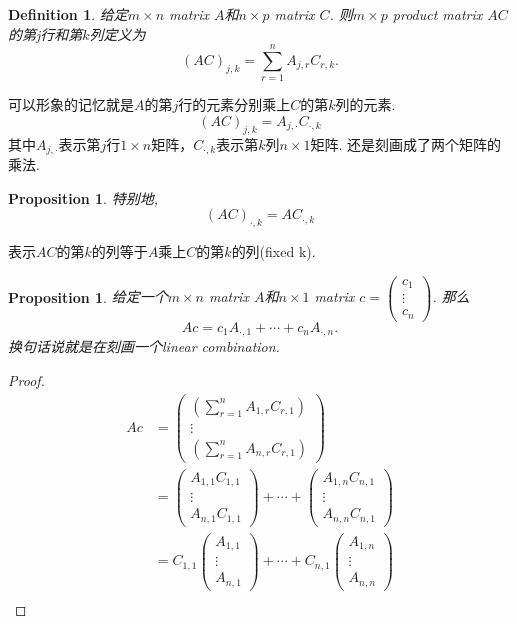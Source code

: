 \documentclass{article}
\newtheorem{proposition}[theorem]{Proposition}
\newtheorem{definition}[theorem]{Definition}
\begin{document}
\begin{definition}
\rm 给定$ m \times n$ matrix $A$和$n \times p$ matrix $C$. 则$m \times p$ product matrix $AC$的第j行和第$k$列定义为
$$
(AC)_{j,k} =  \sum\limits_{r=1}^{n}A_{j,r}C_{r,k} .
$$
\end{definition}

{\color{blue} 可以形象的记忆就是$A$的第$j$行的元素分别乘上$C$的第$k$列的元素}.
$$
(AC)_{j,k}=A_{j,\cdot}C_{\cdot,k}
$$
其中$A_{j,\cdot}$表示第$j$行$1 \times n$矩阵，$C_{\cdot,k}$表示第$k$列$n \times 1$矩阵. 还是刻画成了两个矩阵的乘法.

\begin{proposition}
特别地,
$$
(AC)_{\cdot,k}=AC_{\cdot,k}
$$
\end{proposition}
表示$AC$的第$k$的列等于$A$乘上$C$的第$k$的列(fixed k).

\begin{proposition}
\rm 给定一个$m \times n$ matrix $A$和$n \times 1$ matrix $c = \begin{pmatrix} c_1 \\ \vdots \\ c_n \end{pmatrix}$. 那么
$$
Ac = c_1A_{\cdot,1} + \cdots + c_nA_{\cdot,n}.
$$
换句话说就是在刻画一个linear combination.
\end{proposition}

\begin{proof}
$$
\begin{aligned}
Ac &=  
\begin{pmatrix}
\left(\sum\limits_{r=1}^{n}A_{1,r}C_{r,1}\right)  \\
\vdots \\
\left(\sum\limits_{r=1}^{n}A_{n,r}C_{r,1}\right)  
\end{pmatrix} \\
&= 
\begin{pmatrix}
A_{1,1}C_{1,1} \\
\vdots \\
A_{n,1}C_{1,1} 
\end{pmatrix} + \cdots +
\begin{pmatrix}
A_{1,n}C_{n,1} \\
\vdots \\
A_{n,n}C_{n,1} 
\end{pmatrix}\\ 
&= 
C_{1,1}\begin{pmatrix}
A_{1,1} \\
\vdots \\
A_{n,1} 
\end{pmatrix} + \cdots +
C_{n,1}\begin{pmatrix}
A_{1,n} \\
\vdots \\
A_{n,n} 
\end{pmatrix}\\
\end{aligned}
$$
\end{proof}
\end{document}
